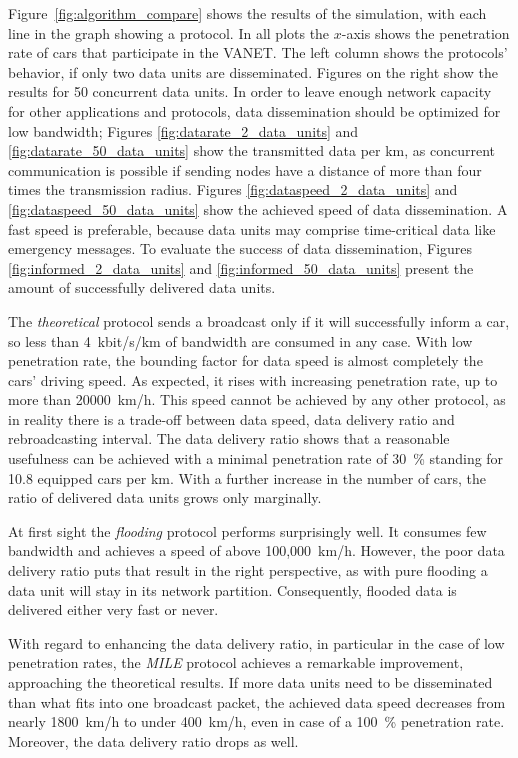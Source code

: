 \documentclass{acmrip}
\newcommand{\figref}[1]{Figure~\ref{fig:#1}}
\begin{document}
\figref{algorithm_compare} shows the results of the simulation, with
each line in the graph showing a protocol. In all plots the $x$-axis
shows the penetration rate of cars that participate in the VANET.
The left column shows the protocols' behavior, if only two data
units are disseminated. Figures on the right show the results for 50
concurrent data units.
In order to leave enough network capacity for other applications and
protocols, data dissemination should be optimized for low bandwidth;
Figures \ref{fig:datarate_2_data_units} and
\ref{fig:datarate_50_data_units} show the transmitted data per km,
as concurrent communication is possible if sending nodes have a
distance of more than four times the transmission radius.
Figures \ref{fig:dataspeed_2_data_units} and
\ref{fig:dataspeed_50_data_units} show the achieved speed of data
dissemination. A fast speed is preferable, because data units may
comprise time-critical data like emergency messages.
To evaluate the success of data dissemination, Figures
\ref{fig:informed_2_data_units} and \ref{fig:informed_50_data_units}
present the amount of successfully delivered data units.


The \textit{theoretical} protocol sends a broadcast only if it will
successfully inform a car, so less than 4~kbit/s/km of bandwidth are
consumed in any case. With low penetration rate, the bounding factor
for data speed is almost completely the cars' driving speed. As
expected, it rises with increasing penetration rate, up to more than
20000~km/h. This speed cannot be achieved by any other protocol, as
in reality there is a trade-off between data speed, data delivery
ratio and rebroadcasting interval. The data delivery ratio shows
that a reasonable usefulness can be achieved with a minimal
penetration rate of 30~\% standing for 10.8 equipped cars per km.
With a further increase in the number of cars, the ratio of
delivered data units grows only marginally.


At first sight the \textit{flooding} protocol performs surprisingly
well. It consumes few bandwidth and achieves a speed of above
100,000~km/h. However, the poor data delivery ratio puts that result
in the right perspective, as with pure flooding a data unit will stay
in its network partition. Consequently, flooded data is delivered
either very fast or never.


With regard to enhancing the data delivery ratio, in particular in
the case of low penetration rates, the \textit{MILE} protocol
achieves a remarkable improvement, approaching the theoretical
results. If more data units need to be disseminated than what fits into
one broadcast packet, the achieved data speed decreases from nearly
1800~km/h to under 400~km/h, even in case of a 100~\% penetration
rate. Moreover, the data delivery ratio drops as well.
\end{document}
